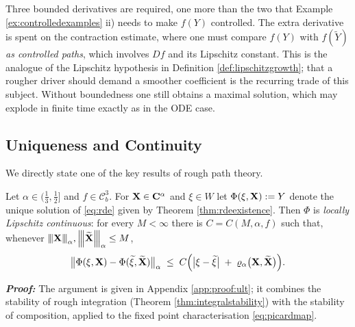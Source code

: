 \begin{remark}\label{rem:c3}
Three bounded derivatives are required, one more than the two that Example
\ref{ex:controlledexamples} ii) needs to make $f(Y)$ controlled. The extra derivative is spent on
the contraction estimate, where one must compare $f(Y)$ with $f(\widetilde Y)$ \emph{as controlled
paths}, which involves $Df$ and its Lipschitz constant. This is the analogue of the Lipschitz
hypothesis in Definition \ref{def:lipschitzgrowth}; that a rougher driver should demand a smoother
coefficient is the recurring trade of this subject. Without boundedness one still obtains a maximal
solution, which may explode in finite time exactly as in the ODE case.
\end{remark}

\subsection{Uniqueness and Continuity}\label{subsec:ult}


We directly state one of the key results of rough path theory.

\begin{theorem}\label{thm:ult}
Let $\alpha \in (\tfrac13,\tfrac12]$ and $f \in \mathcal{C}^3_b$. For $\mathbf{X} \in \mathbf{C}^{\alpha}$ and
$\xi \in W$ let $\Phi(\xi,\mathbf{X}) := Y$ denote the unique solution of \eqref{eq:rde} given by Theorem
\ref{thm:rdeexistence}. Then $\Phi$ is \emph{locally Lipschitz continuous}: for every $M<\infty$
there is $C = C(M,\alpha,f)$ such that, whenever
${\left\vert\kern-0.25ex\left\vert\kern-0.25ex\left\vert \mathbf{X} \right\vert\kern-0.25ex\right\vert\kern-0.25ex\right\vert}_\alpha, {\left\vert\kern-0.25ex\left\vert\kern-0.25ex\left\vert \widetilde{\mathbf{X}} \right\vert\kern-0.25ex\right\vert\kern-0.25ex\right\vert}_\alpha \leq M$,
\begin{equation}\label{eq:ult}
\bigl\lVert \Phi(\xi,\mathbf{X}) - \Phi(\widetilde\xi,\widetilde{\mathbf{X}}) \bigr\rVert_{\alpha}
\;\leq\; C\Bigl( \bigl|\xi - \widetilde\xi\bigr| \;+\; \varrho_{\alpha}\bigl(\mathbf{X},\widetilde{\mathbf{X}}\bigr) \Bigr).
\end{equation}
\end{theorem}

\textbf{\textit{Proof:}} The argument is given in Appendix \ref{app:proof:ult}; it combines the
stability of rough integration (Theorem \ref{thm:integralstability}) with the stability of
composition, applied to the fixed point characterisation \eqref{eq:picardmap}. \qedfilledtext

